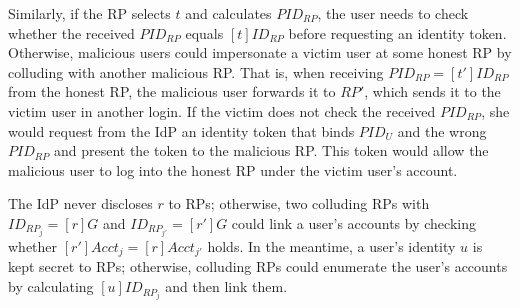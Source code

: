 
Similarly, if the RP selects $t$ and calculates $PID_{RP}$, the user needs to check whether the received $PID_{RP}$ equals $[t]ID_{RP}$ before requesting an identity token.
Otherwise, malicious users could impersonate a victim user at some honest RP by colluding with another malicious RP.
That is, when receiving $PID_{RP}=[t']ID_{RP}$ from the honest RP, the malicious user forwards it to $RP'$, which sends it to the victim user in another login.
If the victim does not check the received $PID_{RP}$, she would request from the IdP an identity token that binds $PID_U$ and the wrong $PID_{RP}$ and present the token to the malicious RP.
This token would allow the malicious user to log into the honest RP under the victim user's account.

\oldc
The IdP never discloses $r$ to RPs; otherwise, two colluding RPs with $ID_{RP_j} = [r]G$ and $ID_{RP_{j'}} = [r']G$ could link a user's accounts by checking whether $[r']Acct_j = [r]Acct_{j'}$ holds.
In the meantime, a user's identity $u$ is kept secret to RPs; otherwise, colluding RPs could enumerate the user's accounts by calculating $[u]ID_{RP_j}$ and then link them.



